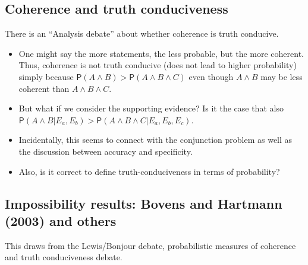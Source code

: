 \documentclass[
  11pt,
  dvipsnames,enabledeprecatedfontcommands]{scrartcl}
\newcommand{\pr}[1]{\ensuremath{\mathsf{P}(#1)}}
\begin{document}
\hypertarget{coherence-and-truth-conduciveness}{%
\subsection{Coherence and truth
conduciveness}\label{coherence-and-truth-conduciveness}}

There is an ``Analysis debate'' about whether coherence is truth
conducive.

\begin{itemize}
\item
  One might say the more statements, the less probable, but the more
  coherent. Thus, coherence is not truth conducive (does not lead to
  higher probability) simply because
  \(\pr{A\wedge B}>\pr{A\wedge B\wedge C}\) even though \(A\wedge B\)
  may be less coherent than \(A\wedge B\wedge C\).
\item
  But what if we consider the supporting evidence? Is it the case that
  also
  \(\pr{A\wedge B \vert E_a, E_b}>\pr{A\wedge B\wedge C \vert E_a, E_b, E_c}\).
\item
  Incidentally, this seems to connect with the conjunction problem as
  well as the discussion between accuracy and specificity.
\item
  Also, is it correct to define truth-conduciveness in terms of
  probability?
\end{itemize}

\hypertarget{impossibility-results-bovens-and-hartmann-2003-and-others}{%
\subsection{Impossibility results: Bovens and Hartmann (2003) and
others}\label{impossibility-results-bovens-and-hartmann-2003-and-others}}

This draws from the Lewis/Bonjour debate, probabilistic measures of
coherence and truth conduciveness debate.
\end{document}
